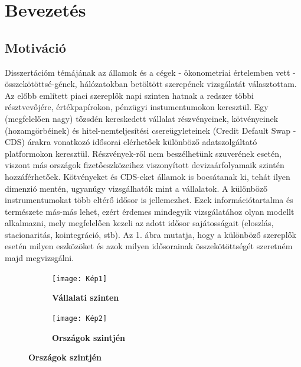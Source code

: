 \documentclass[12pt,bibliography=totoc]{article}
\begin{document}
\tableofcontents

\newpage

\section{Bevezetés}

\subsection{Motiváció}

Disszertációm témájának az államok és a cégek - ökonometriai értelemben vett - összekötöttsé-gének, hálózatokban betöltött szerepének vizsgálatát választottam. Az előbb említett piaci szereplők napi szinten hatnak a redszer többi résztvevőjére, értékpapírokon, pénzügyi instumentumokon keresztül. Egy (megfelelően nagy) tőzsdén kereskedett vállalat részvényeinek, kötvényeinek (hozamgörbéinek) és hitel-nemteljesítési csereügyleteinek (Credit Default Swap -  CDS) árakra vonatkozó idősorai elérhetőek különböző adatszolgáltató platformokon keresztül. Részvények-ről nem beszélhetünk szuverének esetén, viszont más országok fizetőeszközeihez viszonyított devizaárfolyamaik szintén hozzáférhetőek. Kötvényeket és CDS-eket államok is bocsátanak ki, tehát ilyen dimenzió mentén, ugyanúgy vizsgálhatók mint a vállalatok. A különböző instrumentumokat több eltérő idősor is jellemezhet. Ezek információtartalma és természete más-más lehet, ezért érdemes mindegyik vizsgálatához olyan modellt alkalmazni, mely megfelelően kezeli az adott idősor sajátosságait (eloszlás, stacionaritás, kointegráció, stb). Az 1. ábra mutatja, hogy a különböző szereplők esetén milyen eszközöket és azok milyen idősorainak összekötöttségét szeretném majd megvizsgálni.


\begin{figure}[H]
\caption{Összekötöttségi síkok}
 \begin{subfigure}[t]{.5\textwidth}
 \centering
 \texttt{[image: Kép1]}
 \caption{\textbf{Vállalati szinten}}
\end{subfigure}
\hfill
\begin{subfigure}[t]{.5\textwidth}
\centering
\texttt{[image: Kép2]}
\caption{\textbf{Országok szintjén}}
\end{subfigure}
\end{figure}
\end{document}
